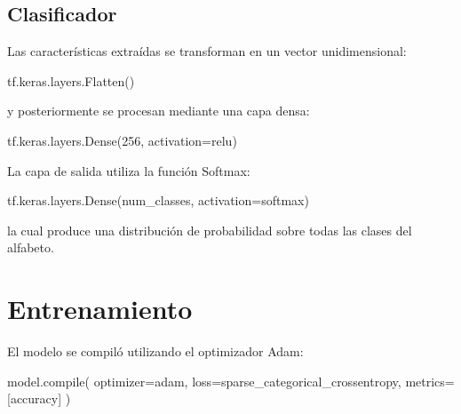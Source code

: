 \documentclass[
  spanish,
  us-letterpaper,
  DIV=11,
  numbers=noendperiod]{scrreprt}
\newenvironment{Shaded}{\begin{snugshade}}{\end{snugshade}}
\newcommand{\BuiltInTok}[1]{\textcolor[rgb]{0.00,0.23,0.31}{#1}}
\newcommand{\DecValTok}[1]{\textcolor[rgb]{0.68,0.00,0.00}{#1}}
\newcommand{\NormalTok}[1]{\textcolor[rgb]{0.00,0.23,0.31}{#1}}
\newcommand{\OperatorTok}[1]{\textcolor[rgb]{0.37,0.37,0.37}{#1}}
\newcommand{\StringTok}[1]{\textcolor[rgb]{0.13,0.47,0.30}{#1}}
\begin{document}
\subsection{Clasificador}\label{clasificador}

Las características extraídas se transforman en un vector
unidimensional:

\begin{Shaded}
\begin{Highlighting}[]
\NormalTok{tf.keras.layers.Flatten()}
\end{Highlighting}
\end{Shaded}

y posteriormente se procesan mediante una capa densa:

\begin{Shaded}
\begin{Highlighting}[]
\NormalTok{tf.keras.layers.Dense(}\DecValTok{256}\NormalTok{, activation}\OperatorTok{=}\StringTok{\textquotesingle{}relu\textquotesingle{}}\NormalTok{)}
\end{Highlighting}
\end{Shaded}

La capa de salida utiliza la función Softmax:

\begin{Shaded}
\begin{Highlighting}[]
\NormalTok{tf.keras.layers.Dense(num\_classes, activation}\OperatorTok{=}\StringTok{\textquotesingle{}softmax\textquotesingle{}}\NormalTok{)}
\end{Highlighting}
\end{Shaded}

la cual produce una distribución de probabilidad sobre todas las clases
del alfabeto.

\section{Entrenamiento}\label{entrenamiento-1}

El modelo se compiló utilizando el optimizador Adam:

\begin{Shaded}
\begin{Highlighting}[]
\NormalTok{model.}\BuiltInTok{compile}\NormalTok{(}
\NormalTok{    optimizer}\OperatorTok{=}\StringTok{\textquotesingle{}adam\textquotesingle{}}\NormalTok{,}
\NormalTok{    loss}\OperatorTok{=}\StringTok{\textquotesingle{}sparse\_categorical\_crossentropy\textquotesingle{}}\NormalTok{,}
\NormalTok{    metrics}\OperatorTok{=}\NormalTok{[}\StringTok{\textquotesingle{}accuracy\textquotesingle{}}\NormalTok{]}
\NormalTok{)}
\end{Highlighting}
\end{Shaded}
\end{document}
